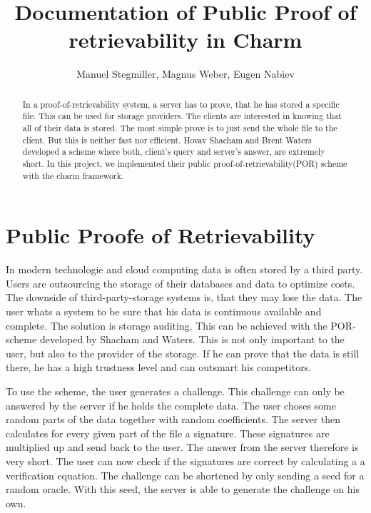 \documentclass{amsart}
\title{Documentation of Public Proof of retrievability in Charm}
\author{Manuel Stegmiller, Magnus Weber, Eugen Nabiev}
\begin{document}
\begin{abstract}
In a proof-of-retrievability system, a server has to prove, that he has stored a specific file. This can be used for storage providers. The clients are interested in knowing that all of their data is stored. The most simple prove is to just send the whole file to the client. But this is neither fast nor efficient. Hovav Shacham and Brent Waters developed a scheme where both, client's query and server's answer, are extremely short. In this project, we implemented their public proof-of-retrievability(POR) scheme with the charm framework.
\end{abstract}
\maketitle
\section{Public Proofe of Retrievability}
In modern technologie and cloud computing data is often stored by a third party. Users are outsourcing the storage of their databases and data to optimize costs. The downside of third-party-storage systems is, that they may lose the data. The user whats a system to be sure that his data is continuous available and complete. The solution is storage auditing. This can be achieved with the POR-scheme developed by Shacham and Waters. This is not only important to the user, but also to the provider of the storage. If he can prove that the data is still there, he has a high trustness level and can outsmart his competitors.

To use the scheme, the user generates a challenge. This challenge can only be answered by the server if he holds the complete data. The user choses some random parts of the data together with random coefficients. The server then calculates for every given part of the file a signature. These signatures are multiplied up and send back to the user. The answer from the server therefore is very short. The user can now check if the signatures are correct by calculating a a verification equation. The challenge can be shortened by only sending a seed for a random oracle. With this seed, the server is able to generate the challenge on his own.
\end{document}
